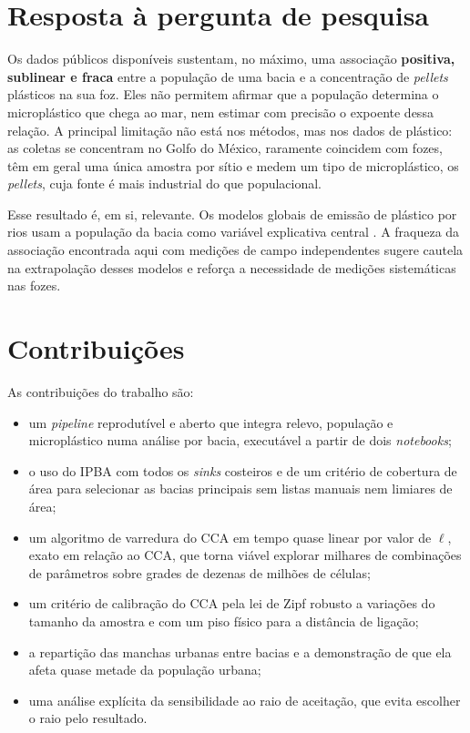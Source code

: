 \section{Resposta à pergunta de pesquisa}

Os dados públicos disponíveis sustentam, no máximo, uma associação \textbf{positiva, sublinear e fraca} entre a população de uma bacia e a concentração de \textit{pellets} plásticos na sua foz. Eles não permitem afirmar que a população determina o microplástico que chega ao mar, nem estimar com precisão o expoente dessa relação. A principal limitação não está nos métodos, mas nos dados de plástico: as coletas se concentram no Golfo do México, raramente coincidem com fozes, têm em geral uma única amostra por sítio e medem um tipo de microplástico, os \textit{pellets}, cuja fonte é mais industrial do que populacional.

Esse resultado é, em si, relevante. Os modelos globais de emissão de plástico por rios usam a população da bacia como variável explicativa central \cite{lebreton2017,meijer2021}. A fraqueza da associação encontrada aqui com medições de campo independentes sugere cautela na extrapolação desses modelos e reforça a necessidade de medições sistemáticas nas fozes.

\section{Contribuições}

As contribuições do trabalho são:

\begin{itemize}
	\item um \textit{pipeline} reprodutível e aberto que integra relevo, população e microplástico numa análise por bacia, executável a partir de dois \textit{notebooks};
	\item o uso do IPBA com todos os \textit{sinks} costeiros e de um critério de cobertura de área para selecionar as bacias principais sem listas manuais nem limiares de área;
	\item um algoritmo de varredura do CCA em tempo quase linear por valor de $\ell$, exato em relação ao CCA, que torna viável explorar milhares de combinações de parâmetros sobre grades de dezenas de milhões de células;
	\item um critério de calibração do CCA pela lei de Zipf robusto a variações do tamanho da amostra e com um piso físico para a distância de ligação;
	\item a repartição das manchas urbanas entre bacias e a demonstração de que ela afeta quase metade da população urbana;
	\item uma análise explícita da sensibilidade ao raio de aceitação, que evita escolher o raio pelo resultado.
\end{itemize}


